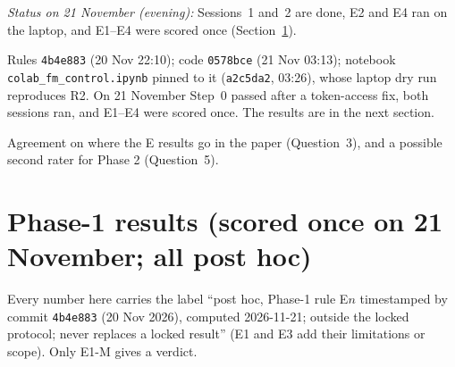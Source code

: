 \documentclass[10pt,a4paper]{article}
\newcommand{\file}[1]{\texttt{\small #1}}
\newcommand{\hash}[1]{\texttt{\footnotesize #1}}
\newenvironment{parts}{\begin{description}[style=unboxed, leftmargin=0pt, itemsep=3pt, font=\normalfont\bfseries\itshape]}{\end{description}}
\begin{document}
\begin{parts}
\smallskip
\noindent
\emph{Status on 21 November (evening):} Sessions~1 and~2 are done, E2 and E4 ran on the laptop, and E1--E4 were
scored once (Section~\ref{sec:p1results}).

\item[Result.] Rules \hash{4b4e883} (20 Nov 22:10); code \hash{0578bce} (21 Nov 03:13); notebook
\file{colab\_fm\_control.ipynb} pinned to it (\hash{a2c5da2}, 03:26), whose laptop dry run reproduces R2. On 21
November Step~0 passed after a token-access fix, both sessions ran, and E1--E4 were scored once. The results are
in the next section.
\item[What I need from you.] Agreement on where the E results go in the paper (Question~3), and a possible second
rater for Phase 2 (Question~5).
\end{parts}

\section{Phase-1 results (scored once on 21 November; all post hoc)}
\label{sec:p1results}

Every number here carries the label ``post hoc, Phase-1 rule E$n$ timestamped by commit \hash{4b4e883} (20 Nov
2026), computed 2026-11-21; outside the locked protocol; never replaces a locked result'' (E1 and E3 add their
limitations or scope). Only E1-M gives a verdict.
\end{document}
